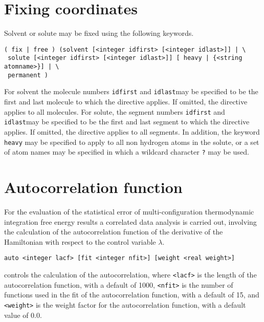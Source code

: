 \section{Fixing coordinates}
Solvent or solute may be fixed using the following keywords. 
\begin{description}
\item
\begin{verbatim}
( fix | free ) (solvent [<integer idfirst> [<integer idlast>]] | \
 solute [<integer idfirst> [<integer idlast>]] [ heavy | {<string atomname>}] | \
 permanent )
\end{verbatim}
For solvent the molecule numbers \verb+idfirst+ and \verb+idlast+may be 
specified to be the first and last molecule to which the directive
applies. If omitted, the directive applies to all molecules. For solute,
the segment numbers \verb+idfirst+ and \verb+idlast+may be 
specified to be the first and last segment to which the directive
applies. If omitted, the directive applies to all segments. In addition,
the keyword \verb+heavy+ may be specified to apply to all non hydrogen
atoms in the solute, or a set of atom names may be specified in which
a wildcard character \verb+?+ may be used.
\end{description}

\section{Autocorrelation function}
For the evaluation of the statistical error of multi-configuration
thermodynamic integration free energy results a correlated data 
analysis is carried out, involving the calculation of the
autocorrelation function of the derivative of the Hamiltonian with
respect to the control variable $\lambda$.
\begin{description}

\item 
\begin{verbatim}
auto <integer lacf> [fit <integer nfit>] [weight <real weight>]
\end{verbatim}
controls the calculation of the autocorrelation,
where \verb+<lacf>+ is the length of the autocorrelation function, with
a default of 1000, \verb+<nfit>+ is the number of functions used in the
fit of the autocorrelation function, with a default of 15, and
\verb+<weight>+ is the weight factor for the autocorrelation function,
with a default value of 0.0.
\end{description}

